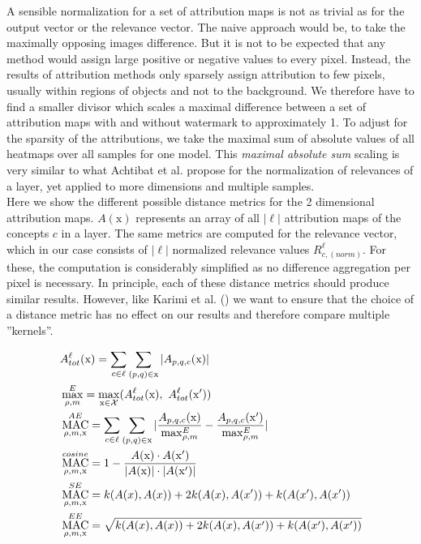 A sensible normalization for a set of attribution maps is not as trivial as for the output vector or the relevance vector. The naive approach would be, to take the maximally opposing images difference. But it is not to be expected that any method would assign large positive or negative values to every pixel. Instead, the results of attribution methods only sparsely assign attribution to few pixels, usually within regions of objects and not to the background. 
We therefore have to find a smaller divisor which scales a maximal difference between a set of attribution maps with and without watermark to approximately 1.
To adjust for the sparsity of the attributions, we take the maximal sum of absolute values of all heatmaps over all samples for one model. This \textit{maximal absolute sum} scaling is very similar to what Achtibat et al. \cite{Achtibat2022} propose for the normalization of relevances of a layer, yet applied to more dimensions and multiple samples.\\

Here we show the different possible distance metrics for the 2 dimensional attribution maps. $A(\mathrm{x})$ represents an array of all $|\ell|$ attribution maps of the concepts $c$ in a layer. The same metrics are computed for the relevance vector, which in our case consists of $|\ell|$ normalized relevance values $R_{c,(norm)}^{\ell}$. For these, the computation is considerably simplified as no difference aggregation per pixel is necessary. In principle, each of these distance metrics should produce similar results. However, like Karimi et al. (\cite{Karimi2023}) we want to ensure that the choice of a distance metric has no effect on our results and therefore compare multiple ''kernels''.

\begin{align}
\displaystyle 
& A_{tot}^{\ell}(\mathrm{x}) = \sum_{c \in \ell} \sum_{(p,q) \in \mathrm{x}} |A_{p,q,c}(\mathrm{x})| \notag \\
& \max_{\rho, m}^E = \max_{\mathrm{x} \in \mathcal{X}} (A_{tot}^{\ell}(\mathrm{x}) , \  A_{tot}^{\ell}(\mathrm{x'}) ) \notag \\
& \operatorname*{MAC}_{\rho, m, \mathrm{x}}^{AE} = 
\sum_{c \in \ell} \sum_{(p,q) \in \mathrm{x}}| \frac{A_{p,q,c}(\mathrm{x})}{\max_{\rho, m}^E} -\frac{A_{p,q,c}(\mathrm{x'})}{\max_{\rho, m}^E}|\\
& \operatorname*{MAC}_{\rho, m,\mathrm{x}}^{cosine} = 1- 
\frac{A(\mathrm{x}) \cdot A(\mathrm{x'}) }{|A(\mathrm{x})|\cdot |A(\mathrm{x'})|} \\
& \operatorname*{MAC}_{\rho, m, \mathrm{x}}^{SE} = k(A(x) ,A(x) ) + 2 k(A(x) ,A(x') ) + k(A(x') ,A(x') )   \\
& \operatorname*{MAC}_{\rho, m, \mathrm{x}}^{EE} = \sqrt{ k(A(x) ,A(x) ) + 2 k(A(x) ,A(x') ) + k(A(x') ,A(x') ) 
}
\end{align}

